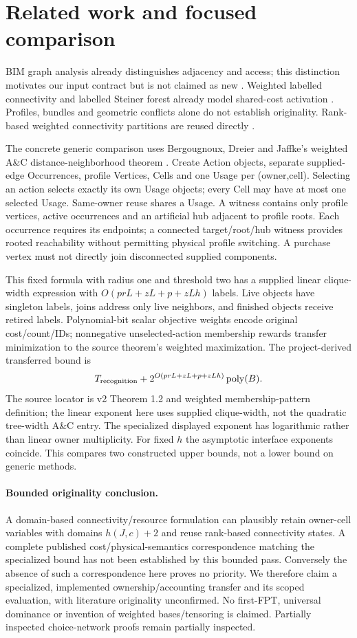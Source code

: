 \documentclass[10pt]{article}
\begin{document}
\section{Related work and focused comparison}
BIM graph analysis already distinguishes adjacency and access; this distinction motivates our input contract but is not claimed as new \cite{bim}. Weighted labelled connectivity and labelled Steiner forest already model shared-cost activation \cite{labels}. Profiles, bundles and geometric conflicts alone do not establish originality. Rank-based weighted connectivity partitions are reused directly \cite{rank}.

The concrete generic comparison uses Bergougnoux, Dreier and Jaffke's weighted A\&C distance-neighborhood theorem \cite{logic}. Create Action objects, separate supplied-edge Occurrences, profile Vertices, Cells and one Usage per (owner,cell). Selecting an action selects exactly its own Usage objects; every Cell may have at most one selected Usage. Same-owner reuse shares a Usage. A witness contains only profile vertices, active occurrences and an artificial hub adjacent to profile roots. Each occurrence requires its endpoints; a connected target/root/hub witness provides rooted reachability without permitting physical profile switching. A purchase vertex must not directly join disconnected supplied components.

This fixed formula with radius one and threshold two has a supplied linear clique-width expression with $O(prL+zL+p+zLh)$ labels. Live objects have singleton labels, joins address only live neighbors, and finished objects receive retired labels. Polynomial-bit scalar objective weights encode original cost/count/IDs; nonnegative unselected-action membership rewards transfer minimization to the source theorem's weighted maximization. The project-derived transferred bound is
\[
T_{\rm recognition}+2^{O(prL+zL+p+zLh)}\operatorname{poly}(B).
\]
The source locator is v2 Theorem 1.2 and weighted membership-pattern definition; the linear exponent here uses supplied clique-width, not the quadratic tree-width A\&C entry. The specialized displayed exponent has logarithmic rather than linear owner multiplicity. For fixed $h$ the asymptotic interface exponents coincide. This compares two constructed upper bounds, not a lower bound on generic methods.

\paragraph{Bounded originality conclusion.}
A domain-based connectivity/resource formulation can plausibly retain owner-cell variables with domains $h(J,c)+2$ and reuse rank-based connectivity states. A complete published cost/physical-semantics correspondence matching the specialized bound has not been established by this bounded pass. Conversely the absence of such a correspondence here proves no priority. We therefore claim a specialized, implemented ownership/accounting transfer and its scoped evaluation, with literature originality unconfirmed. No first-FPT, universal dominance or invention of weighted bases/tensoring is claimed. Partially inspected choice-network proofs remain partially inspected.
\end{document}
